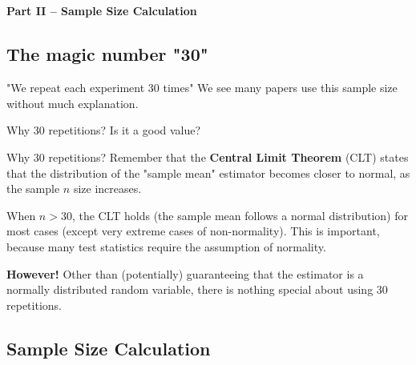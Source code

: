 \subsection{}
\begin{frame}{}
  \begin{center}
    {\bf Part II -- Sample Size Calculation}
  \end{center}
\end{frame}


\subsection{The magic number "30"}

\begin{frame}{"We repeat each experiment 30 times"}
  We see many papers use this sample size without much explanation.
  \bigskip

  Why 30 repetitions? Is it a good value?
\end{frame}

\begin{frame}{Why 30 repetitions?}
  Remember that the {\bf Central Limit Theorem} (CLT) states that the distribution
  of the "sample mean" estimator becomes closer to normal, as the sample
  $n$ size increases.\bigskip

  When $n > 30$, the CLT holds (the sample mean follows a normal distribution)
  for most cases (except very extreme cases of non-normality). This is important,
  because many test statistics require the assumption of normality.
  \bigskip

  {\bf However!} Other than (potentially) guaranteeing that the estimator
  is a normally distributed random variable, there is nothing special about
  using 30 repetitions.\bigskip

\end{frame}

\subsection{Sample Size Calculation}


